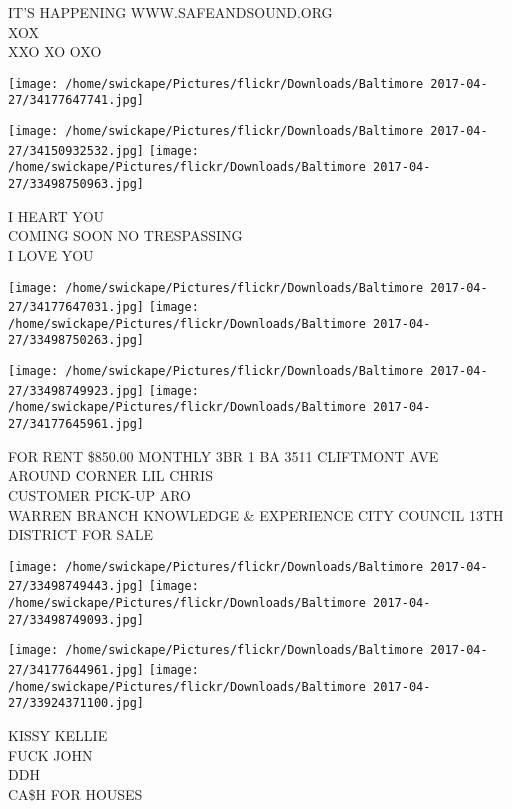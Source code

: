 \documentclass[10pt,letterpaper]{article}
\begin{document}
IT'S HAPPENING WWW.SAFEANDSOUND.ORG\\
XOX\\
XXO XO OXO\\
\pagebreak

\texttt{[image: /home/swickape/Pictures/flickr/Downloads/Baltimore 2017-04-27/34177647741.jpg]}

\vspace{0.25in}
\texttt{[image: /home/swickape/Pictures/flickr/Downloads/Baltimore 2017-04-27/34150932532.jpg]}
\texttt{[image: /home/swickape/Pictures/flickr/Downloads/Baltimore 2017-04-27/33498750963.jpg]}

I HEART YOU\\
COMING SOON NO TRESPASSING\\
I LOVE YOU\\
\pagebreak

\texttt{[image: /home/swickape/Pictures/flickr/Downloads/Baltimore 2017-04-27/34177647031.jpg]}
\texttt{[image: /home/swickape/Pictures/flickr/Downloads/Baltimore 2017-04-27/33498750263.jpg]}

\texttt{[image: /home/swickape/Pictures/flickr/Downloads/Baltimore 2017-04-27/33498749923.jpg]}
\texttt{[image: /home/swickape/Pictures/flickr/Downloads/Baltimore 2017-04-27/34177645961.jpg]}

FOR RENT \$850.00 MONTHLY 3BR 1 BA 3511 CLIFTMONT AVE\\
AROUND CORNER LIL CHRIS\\
CUSTOMER PICK{-}UP ARO\\
WARREN BRANCH KNOWLEDGE \& EXPERIENCE CITY COUNCIL 13TH DISTRICT FOR SALE\\
\pagebreak

\texttt{[image: /home/swickape/Pictures/flickr/Downloads/Baltimore 2017-04-27/33498749443.jpg]}
\texttt{[image: /home/swickape/Pictures/flickr/Downloads/Baltimore 2017-04-27/33498749093.jpg]}

\texttt{[image: /home/swickape/Pictures/flickr/Downloads/Baltimore 2017-04-27/34177644961.jpg]}
\texttt{[image: /home/swickape/Pictures/flickr/Downloads/Baltimore 2017-04-27/33924371100.jpg]}

KISSY KELLIE\\
FUCK JOHN\\
DDH\\
CA\$H FOR HOUSES\\
\pagebreak
\end{document}
